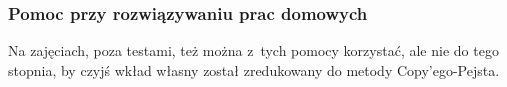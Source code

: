 \documentclass[10pt,t]{beamer}
\begin{document}
\begin{frame}
  \frametitle{Pomoc przy rozwiązywaniu prac domowych}






  Na zajęciach, poza testami, też można z~tych pomocy korzystać, ale nie do
  tego stopnia, by czyjś wkład własny został zredukowany do metody
  Copy’ego-Pejsta.

  \vspace{-0.5em}





  \begin{figure}

    \label{fig:The-best-salute}

    \centering



\end{figure}
\end{frame}
\end{document}
